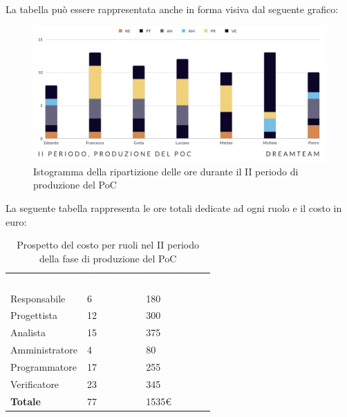 La tabella può essere rappresentata anche in forma visiva dal seguente grafico:
\begin{figure}[H]
\centering
\includegraphics[scale=0.65]{Sezioni/SezioniPreventivo/grafici/Poc_II_periodo.png}
\caption{Istogramma della ripartizione delle ore durante il II periodo di produzione del PoC}
\end{figure}

La seguente tabella rappresenta le ore totali dedicate ad ogni ruolo e il costo in euro:

\begin{table}[H]
\begin{center}
\renewcommand{\arraystretch}{1.5}
\begin{tabular}{ m{}<{\centering}  m{}<{\centering} m{}<{\centering}}
	\rowcolor{darkblue}
	\textcolor{white}{\textbf{Ruolo}}&\textcolor{white}{\textbf{Totale ore}}&\textcolor{white}{\textbf{Costo totale}}\\ 

	Responsabile  & 6 & 180 \\	
	
	Progettista & 12 & 300 \\
	
	Analista & 15 & 375 \\

	Amministratore & 4 & 80 \\
	
	Programmatore & 17 & 255 \\
	
	Verificatore & 23 & 345 \\
	
	\textbf{Totale} & 77 & 1535\euro \\
	
\end{tabular}
\caption{Prospetto del costo per ruoli nel II periodo della fase di produzione del PoC}
\end{center}
\end{table}

